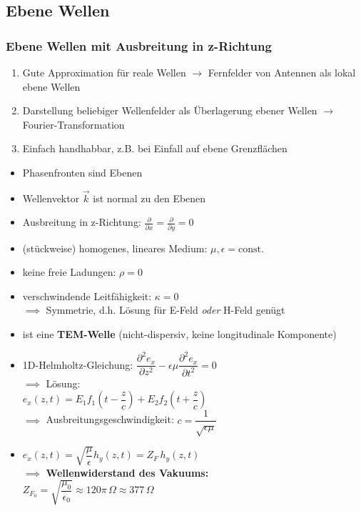 \begin{multicols}{3}
	 \subsection{Ebene Wellen}
	 {\small%
	 \subsubsection{Ebene Wellen mit Ausbreitung in z-Richtung}
	 \begin{enumerate}
	 	\itemsep0pt
		\item Gute Approximation für reale Wellen \(\to\) Fernfelder von Antennen als lokal ebene Wellen
		\item Darstellung beliebiger Wellenfelder als Überlagerung ebener Wellen \(\to\) Fourier-Transformation
		\item Einfach handhabbar, z.B. bei Einfall auf ebene Grenzflächen
	 \end{enumerate}
	 \begin{itemize}
	 	\itemsep0pt
		\item Phasenfronten sind Ebenen
		\item Wellenvektor \(\vec{k}\) ist normal zu den Ebenen
		\item Ausbreitung in z-Richtung: \(\frac{\partial}{\partial x} = \frac{\partial}{\partial y} = 0\)
		\item (stückweise) homogenes, lineares Medium: \(\mu, \epsilon = \mathrm{const.}\)
		\item keine freie Ladungen: \(\rho = 0\)
		\item verschwindende Leitfähigkeit: \(\kappa = 0\)\\
		\(\implies\) Symmetrie, d.h. Lösung für E-Feld \textit{oder} H-Feld genügt
		\item ist eine \textbf{TEM-Welle} (nicht-dispersiv, keine longitudinale Komponente)
		\item 1D-Helmholtz-Gleichung: \(\dfrac{\partial^2e_x}{\partial z^2} - \epsilon\mu \dfrac{\partial^2 e_x}{\partial t^2} = 0\)\\
		\(\implies\) Lösung:\\
		\(e_x(z,t) = E_1 f_1\left(t - \dfrac{z}{c}\right) + E_2 f_2\left(t + \dfrac{z}{c}\right)\)\\
		\(\implies\) Ausbreitungsgeschwindigkeit: \(c = \dfrac{1}{\sqrt{\epsilon\mu}}\)
		\item \(e_x(z,t) = \sqrt{\dfrac{\mu}{\epsilon}} h_y(z,t) = Z_F\, h_y(z,t) \)\\
		\(\implies\) \textbf{Wellenwiderstand des Vakuums:}\\
		\(Z_{F_0} = \sqrt{\dfrac{\mu_0}{\epsilon_0}} \approx 120\pi\,\Omega \approx 377\,\Omega\)
	 \end{itemize}
}
\end{multicols}
